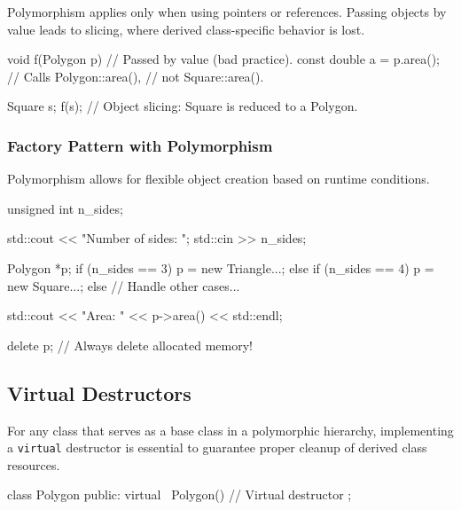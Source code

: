\vspace{-0.5em}

\begin{warningblock}
    Polymorphism applies only when using pointers or references.  
    Passing objects by value leads to slicing, where derived class-specific behavior is lost.
\end{warningblock}

\begin{codeblock}[language=C++, numbers=none]
void f(Polygon p) { // Passed by value (bad practice).
    const double a = p.area(); // Calls Polygon::area(),
                               // not Square::area().
}

Square s;
f(s); // Object slicing: Square is reduced to a Polygon.
\end{codeblock}

\subsubsection{Factory Pattern with Polymorphism}

Polymorphism allows for flexible object creation based on runtime conditions.

\begin{codeblock}[language=C++]
unsigned int n_sides;

std::cout << "Number of sides: ";
std::cin >> n_sides;

Polygon *p;
if (n_sides == 3)
    p = new Triangle{...};
else if (n_sides == 4)
    p = new Square{...};
else {
    // Handle other cases...
}

std::cout << "Area: " << p->area() << std::endl;

delete p; // Always delete allocated memory!
\end{codeblock}

\subsection{Virtual Destructors}

For any class that serves as a base class in a polymorphic hierarchy, implementing a \texttt{virtual} destructor is essential to guarantee proper cleanup of derived class resources.

\begin{codeblock}[language=C++, numbers=none]
class Polygon {
public:
    virtual ~Polygon() {} // Virtual destructor
};
\end{codeblock}

